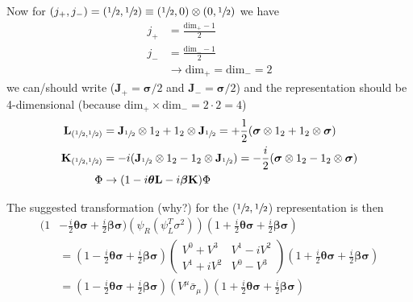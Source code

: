 \documentclass[../main.tex]{subfiles}
\begin{document}
\begin{enumerate}[(a)]
Now for $(j_+,j_-)=(\sfrac{1}{2},\sfrac{1}{2})\equiv(\sfrac{1}{2},0)\otimes(0,\sfrac{1}{2})$ we have
\begin{align}
j_+&=\frac{\text{dim}_+-1}{2}\\
j_-&=\frac{\text{dim}_--1}{2}\\
&\rightarrow\text{dim}_+=\text{dim}_-=2
\end{align}
we can/should write ($\mathbf{J}_+=\boldsymbol{\sigma}/2$ and $\mathbf{J}_-=\boldsymbol{\sigma}/2$)
and the representation should be 4-dimensional (because $\text{dim}_+\times\text{dim}_-=2\cdot2=4$)
\begin{align}
\mathbf{L}_{(\sfrac{1}{2},\sfrac{1}{2})}&=\mathbf{J}_{\sfrac{1}{2}}\otimes1_2+1_2\otimes\mathbf{J}_{\sfrac{1}{2}}=+\frac{1}{2}(\boldsymbol{\sigma}\otimes1_2+1_2\otimes\boldsymbol{\sigma})\\
\mathbf{K}_{(\sfrac{1}{2},\sfrac{1}{2})}&=-i(\mathbf{J}_{\sfrac{1}{2}}\otimes1_2-1_2\otimes\mathbf{J}_{\sfrac{1}{2}})=-\frac{i}{2}(\boldsymbol{\sigma}\otimes1_2-1_2\otimes\boldsymbol{\sigma})\\
\Phi&\rightarrow(1-i\boldsymbol{\theta}\mathbf{L}-i\boldsymbol{\beta}\mathbf{K})\Phi
\end{align}


The suggested transformation (why?) for the ($\sfrac{1}{2},\sfrac{1}{2}$) representation is then
\begin{align}
(1&-\frac{i}{2}\boldsymbol{\theta}\boldsymbol{\sigma}+\frac{i}{2}\boldsymbol{\beta}\boldsymbol{\sigma})
\left(
\psi_R(\psi_L^T\sigma^2)
\right)
(1+\frac{i}{2}\boldsymbol{\theta}\boldsymbol{\sigma}+\frac{i}{2}\boldsymbol{\beta}\boldsymbol{\sigma})\\
&=(1-\frac{i}{2}\boldsymbol{\theta}\boldsymbol{\sigma}+\frac{i}{2}\boldsymbol{\beta}\boldsymbol{\sigma})
\left(
\begin{matrix}
V^0+V^3 & V^1-iV^2\\
V^1+iV^2 & V^0-V^3
\end{matrix}
\right)
(1+\frac{i}{2}\boldsymbol{\theta}\boldsymbol{\sigma}+\frac{i}{2}\boldsymbol{\beta}\boldsymbol{\sigma})\\
&=(1-\frac{i}{2}\boldsymbol{\theta}\boldsymbol{\sigma}+\frac{i}{2}\boldsymbol{\beta}\boldsymbol{\sigma})
(V^\mu\bar{\sigma}_\mu)
(1+\frac{i}{2}\boldsymbol{\theta}\boldsymbol{\sigma}+\frac{i}{2}\boldsymbol{\beta}\boldsymbol{\sigma})\\
\end{align}

\end{enumerate}
\end{document}
